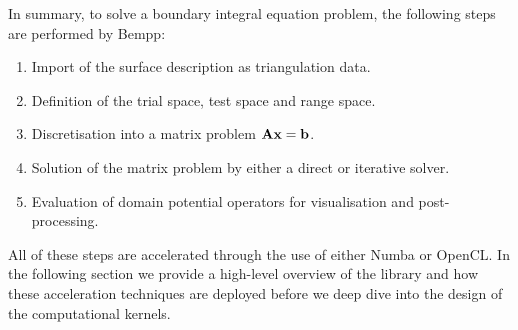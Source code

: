 In summary, to solve a boundary integral equation problem, the following steps are performed by Bempp:
\begin{enumerate}
	\item Import of the surface description as triangulation data.
	\item Definition of the trial space, test space and range space.
	\item Discretisation into a matrix problem $\mathbf{A}\mathbf{x}=\mathbf{b}$.
	\item Solution of the matrix problem by either a direct or iterative solver.
	\item Evaluation of domain potential operators for visualisation and post-processing.
\end{enumerate}

All of these steps are accelerated through the use of either Numba or OpenCL. In the following section we provide a high-level overview of the library and how these acceleration techniques are deployed before we deep dive into the design of the computational kernels.
